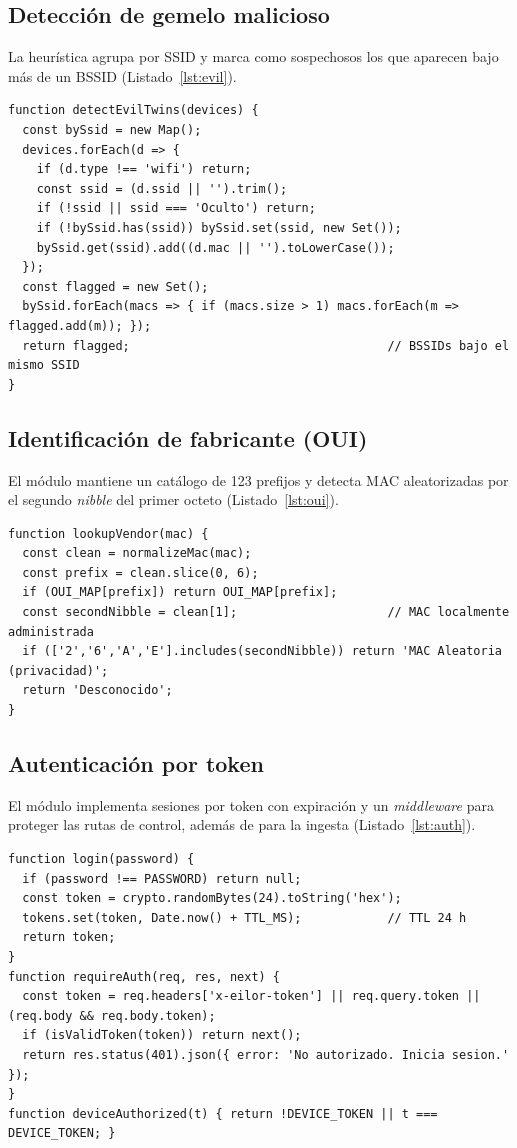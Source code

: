 \subsection{Detección de gemelo malicioso}
La heurística agrupa por SSID y marca como sospechosos los que aparecen bajo más de un BSSID (Listado~\ref{lst:evil}).

\begin{lstlisting}[style=js,caption={Detección de evil twin (lib/analysis.js)},label={lst:evil}]
function detectEvilTwins(devices) {
  const bySsid = new Map();
  devices.forEach(d => {
    if (d.type !== 'wifi') return;
    const ssid = (d.ssid || '').trim();
    if (!ssid || ssid === 'Oculto') return;
    if (!bySsid.has(ssid)) bySsid.set(ssid, new Set());
    bySsid.get(ssid).add((d.mac || '').toLowerCase());
  });
  const flagged = new Set();
  bySsid.forEach(macs => { if (macs.size > 1) macs.forEach(m => flagged.add(m)); });
  return flagged;                                    // BSSIDs bajo el mismo SSID
}
\end{lstlisting}

\subsection{Identificación de fabricante (OUI)}
El módulo  mantiene un catálogo de 123 prefijos y detecta MAC aleatorizadas por el segundo \emph{nibble} del primer octeto (Listado~\ref{lst:oui}).

\begin{lstlisting}[style=js,caption={Búsqueda de fabricante y MAC aleatoria (lib/oui.js)},label={lst:oui}]
function lookupVendor(mac) {
  const clean = normalizeMac(mac);
  const prefix = clean.slice(0, 6);
  if (OUI_MAP[prefix]) return OUI_MAP[prefix];
  const secondNibble = clean[1];                     // MAC localmente administrada
  if (['2','6','A','E'].includes(secondNibble)) return 'MAC Aleatoria (privacidad)';
  return 'Desconocido';
}
\end{lstlisting}

\subsection{Autenticación por token}
El módulo  implementa sesiones por token con expiración y un \emph{middleware}  para proteger las rutas de control, además de  para la ingesta (Listado~\ref{lst:auth}).

\begin{lstlisting}[style=js,caption={Sesiones y middleware de autorización (lib/auth.js)},label={lst:auth}]
function login(password) {
  if (password !== PASSWORD) return null;
  const token = crypto.randomBytes(24).toString('hex');
  tokens.set(token, Date.now() + TTL_MS);            // TTL 24 h
  return token;
}
function requireAuth(req, res, next) {
  const token = req.headers['x-eilor-token'] || req.query.token || (req.body && req.body.token);
  if (isValidToken(token)) return next();
  return res.status(401).json({ error: 'No autorizado. Inicia sesion.' });
}
function deviceAuthorized(t) { return !DEVICE_TOKEN || t === DEVICE_TOKEN; }
\end{lstlisting}

